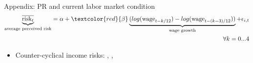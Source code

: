 \documentclass{beamer}
\begin{document}
\begin{frame}{Appendix: PR and current labor market condition}
		\label{appendix:PR_macro_labor_market_correlation}
	\begin{eqnarray*}
		\underbrace{\overline{\text{risk}_{t}}}_{\text{average perceived risk}} = \alpha + \textcolor{red}{\beta} \underbrace{(log(\text{wage}_{t-k/12}) - log(\text{wage}_{t-(k-3)/12}))}  _{\text{wage growth}}  + \epsilon_{i,t}	 \\
		\quad \forall k =0...4
	\end{eqnarray*}
	
	\begin{table}
		\centering
		\label{macro_corr_he}
	\end{table}
	\begin{itemize}
		\item Counter-cyclical income risks: \cite{storesletten2004cyclical}, \cite{guvenen2014nature}, \cite{bayer2019precautionary}
	\end{itemize}
	\quad  \hyperlink{tsMean3mvrvar_he}{} 
\end{frame}
\end{document}
